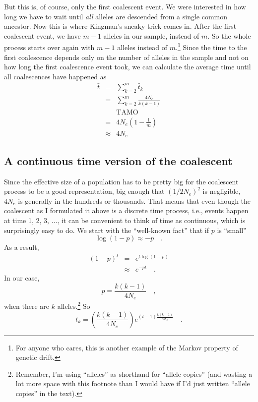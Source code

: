 \documentclass[12pt]{article}
\begin{document}
But this is, of course, only the first coalescent event. We were
interested in how long we have to wait until {\it all\/} alleles are
descended from a single common ancestor. Now this is where Kingman's
sneaky trick comes in. After the first coalescent event, we have $m-1$
alleles in our sample, instead of $m$. So the whole process starts
over again with $m-1$ alleles instead of $m$.\footnote{For anyone who
  cares, this is another example of the Markov property of genetic
  drift.} Since the time to the
first coalescence depends only on the number of alleles in the sample
and not on how long the first coalescence event took, we can calculate
the average time until all coalescences have happened
as
\begin{eqnarray*}
\bar t &=& \sum_{k=2}^m \bar t_k \\
       &=& \sum_{k=2}^m \frac{4N_e}{k(k-1)} \\
       && \mbox{TAMO} \\
       &=& 4N_e\left(1 - \frac{1}{m}\right) \\
       &\approx& 4N_e
\end{eqnarray*}

\subsection*{A continuous time version of the coalescent}

Since the effective size of a population has to be pretty big for the
coalescent process to be a good representation, big enough that
$(1/2N_e)^2$ is negligible, $4N_e$ is generally in the hundreds or
thousands. That means that even though the coalescent as I formulated
it above is a discrete time process, i.e., events happen at time 1, 2,
3, $\dots$, it can be convenient to think of time as continuous, which
is surprisingly easy to do. We start with the ``well-known fact'' that
if $p$ is ``small''
\[
\log(1-p) \approx -p \quad .
\]
As a result,
\begin{eqnarray*}
(1 - p)^t &=& e^{t \log(1-p)} \\
          &\approx& e^{-pt} \quad .
\end{eqnarray*}
In our case,
\[
p = \frac{k(k-1)}{4N_e} \quad ,
\]
when there are $k$ alleles.\footnote{Remember, I'm using ``alleles''
  as shorthand for ``allele copies'' (and wasting a lot more space
  with this footnote than I would have if I'd just written ``allele
  copies'' in the text).} So
\[
t_k = \left(\frac{k(k-1)}{4N_e}\right)e^{{(t-1)}{\frac{k(k-1)}{4N_e}}} \quad .
\]
\end{document}
